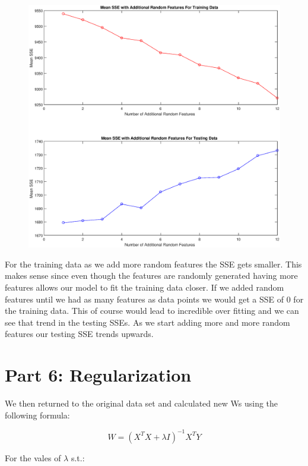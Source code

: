 \documentclass{article}
\begin{document}
	\begin{figure}[h!]
		\begin{center} 
			\includegraphics[scale=0.5]{random_figure.eps} 
		\end{center} 
		\label{fig:M1}
	\end{figure}
	
For the training data as we add more random features the SSE gets smaller. This makes sense since even though the features are randomly generated having more features allows our model to fit the training data closer. If we added random features until we had as many features as data points we would get a SSE of 0 for the training data. This of course would lead to incredible over fitting and we can see that trend in the testing SSEs. As we start adding more and more random features our testing SSE trends upwards.
	
	\newpage
	
	\section*{Part 6: Regularization}
	
We then returned to the original data set and calculated new Ws using the following formula:
	
	$$
	W = (X^{T}X + \lambda I)^{-1}X^{T}Y
	$$
	
For the vales of $\lambda$ s.t.:
\end{document}
